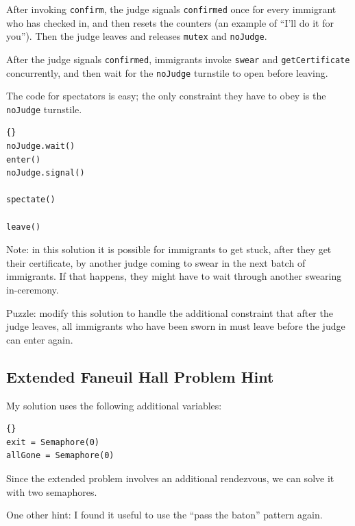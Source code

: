 \documentclass{book}
\newcommand{\clearemptydoublepage}{\newpage\cleardoublepage}
\begin{document}
After invoking {\tt confirm}, the judge signals {\tt confirmed}
once for every immigrant who has checked in, and then resets
the counters (an example of ``I'll do it for you'').
Then the judge leaves and releases {\tt mutex} and {\tt noJudge}.

After the judge signals {\tt confirmed}, immigrants invoke
{\tt swear} and {\tt getCertificate} concurrently, and then
wait for the {\tt noJudge} turnstile to open before leaving.

The code for spectators is easy; the only constraint they have
to obey is the {\tt noJudge} turnstile.

\begin{latin}
\begin{lstlisting}[title={Faneuil Hall problem solution (spectator)}]{}
noJudge.wait()
enter()
noJudge.signal()

spectate()

leave()
\end{lstlisting}
\end{latin}

Note: in this solution it is possible for immigrants to get stuck,
after they get their certificate, by another judge coming to swear
in the next batch of immigrants.  If that happens, they might have
to wait through another swearing in-ceremony.

Puzzle: modify this solution to handle the additional constraint
that after the judge leaves, all immigrants who have been sworn
in must leave before the judge can enter again.


\clearemptydoublepage
\subsection {Extended Faneuil Hall Problem Hint}

My solution uses the following additional variables:

\begin{latin}
\begin{lstlisting}[title={Faneuil Hall problem hint}]{}
exit = Semaphore(0)
allGone = Semaphore(0)
\end{lstlisting}
\end{latin}

Since the extended problem involves an additional rendezvous,
we can solve it with two semaphores.

One other hint: I found it useful to use the ``pass the baton''
pattern again.


\clearemptydoublepage
\end{document}
